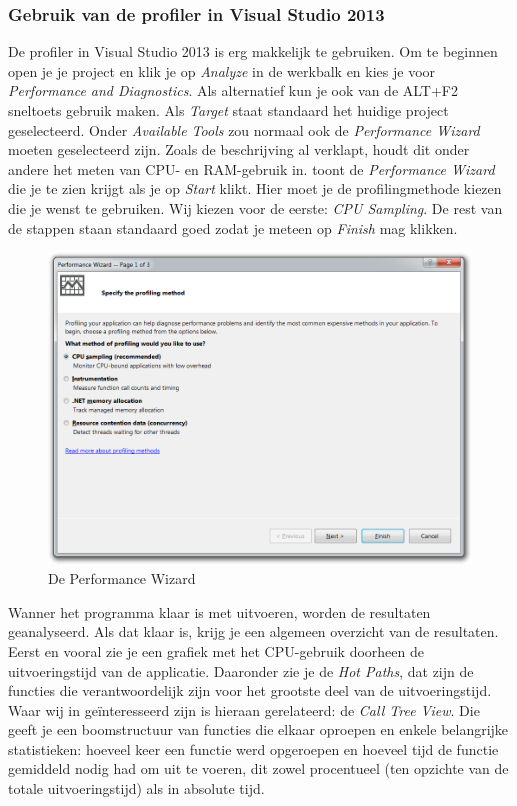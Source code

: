 \subsubsection{Gebruik van de profiler in Visual Studio 2013}

De profiler in Visual Studio 2013 is erg makkelijk te gebruiken.
Om te beginnen open je je project en klik je op \emph{Analyze} in de werkbalk en kies je voor \emph{Performance and Diagnostics}.
Als alternatief kun je ook van de ALT+F2 sneltoets gebruik maken. %
Als \emph{Target} staat standaard het huidige project geselecteerd.
Onder \emph{Available Tools} zou normaal ook de \emph{Performance Wizard} moeten geselecteerd zijn.
Zoals de beschrijving al verklapt, houdt dit onder andere het meten van CPU- en RAM-gebruik in.
 toont de \emph{Performance Wizard} die je te zien krijgt als je op \emph{Start} klikt.
Hier moet je de profilingmethode kiezen die je wenst te gebruiken.
Wij kiezen voor de eerste: \emph{CPU Sampling}.
De rest van de stappen staan standaard goed zodat je meteen op \emph{Finish} mag klikken.

\begin{figure}[]
	\centering
	\includegraphics[scale=0.50]{figures/profiler/performance-wizard}
	\caption{De Performance Wizard}
	\label{performance-wizard}
\end{figure}

Wanner het programma klaar is met uitvoeren, worden de resultaten geanalyseerd.
Als dat klaar is, krijg je een algemeen overzicht van de resultaten.
Eerst en vooral zie je een grafiek met het CPU-gebruik doorheen de uitvoeringstijd van de applicatie.
Daaronder zie je de \emph{Hot Paths}, dat zijn de functies die verantwoordelijk zijn voor het grootste deel van de uitvoeringstijd.
Waar wij in geïnteresseerd zijn is hieraan gerelateerd: de \emph{Call Tree View}.
Die geeft je een boomstructuur van functies die elkaar oproepen en enkele belangrijke statistieken:
hoeveel keer een functie werd opgeroepen en hoeveel tijd de functie gemiddeld nodig had om uit te voeren,
dit zowel procentueel (ten opzichte van de totale uitvoeringstijd) als in absolute tijd.

